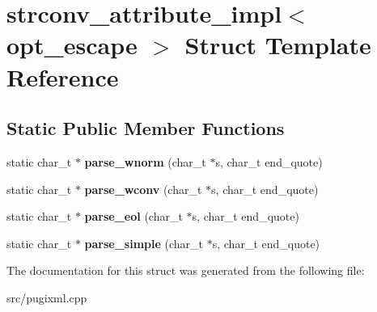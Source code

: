 \hypertarget{structstrconv__attribute__impl}{}\section{strconv\+\_\+attribute\+\_\+impl$<$ opt\+\_\+escape $>$ Struct Template Reference}
\label{structstrconv__attribute__impl}
\subsection*{Static Public Member Functions}
\begin{DoxyCompactItemize}
\item 
\mbox{\label{structstrconv__attribute__impl_a9b7f8b1e860c5d022dbd29f9a89e9e27}} 
static char\+\_\+t $\ast$ {\bfseries parse\+\_\+wnorm} (char\+\_\+t $\ast$s, char\+\_\+t end\+\_\+quote)
\item 
\mbox{\label{structstrconv__attribute__impl_a2d39998b79896af7c53c5f3dc22a526b}} 
static char\+\_\+t $\ast$ {\bfseries parse\+\_\+wconv} (char\+\_\+t $\ast$s, char\+\_\+t end\+\_\+quote)
\item 
\mbox{\label{structstrconv__attribute__impl_a0f57ee9d69b9d626765f4a9c8af6df2e}} 
static char\+\_\+t $\ast$ {\bfseries parse\+\_\+eol} (char\+\_\+t $\ast$s, char\+\_\+t end\+\_\+quote)
\item 
\mbox{\label{structstrconv__attribute__impl_a8358dc980178e55c8669b9dcd04872d7}} 
static char\+\_\+t $\ast$ {\bfseries parse\+\_\+simple} (char\+\_\+t $\ast$s, char\+\_\+t end\+\_\+quote)
\end{DoxyCompactItemize}


The documentation for this struct was generated from the following file\+:\begin{DoxyCompactItemize}
\item 
src/pugixml.\+cpp\end{DoxyCompactItemize}

